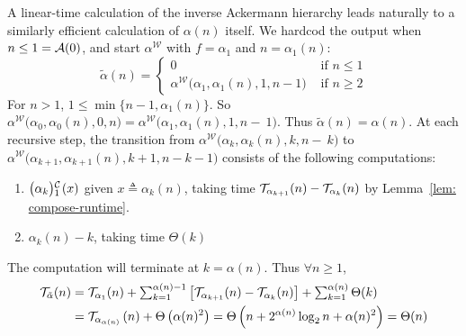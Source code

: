 A linear-time calculation of the inverse Ackermann hierarchy 
leads naturally to a similarly efficient calculation of $\alpha(n)$ itself.
We hardcod the output when $n\le 1 = \mathcal{A}(0)$, and start $\alpha^{\mathcal{W}}$ with $f = \alpha_1$ and $n = \alpha_1(n)$:
\begin{equation*}
\tilde{\alpha}(n) = \begin{cases}
0 & \text{ if } n \le 1 \\ \alpha^{\mathcal{W}}\big(\alpha_1, \alpha_1(n), 1, n-1\big) & \text{ if } n \ge 2
\end{cases}
\end{equation*}
For $n > 1$, $1\le \min\big\{n-1, \alpha_1(n)\big\}$. So
$\alpha^{\mathcal{W}}\big(\alpha_0, \alpha_0(n), 0, n\big) =
\alpha^{\mathcal{W}}\big(\alpha_1, \alpha_1(n), 1, n-~1\big)$.
Thus $\tilde{\alpha}(n) = \alpha(n)$. At each recursive step, the transition from $\alpha^{\mathcal{W}}\big(\alpha_k, \alpha_k(n), k, n-~k\big)$ to $\alpha^{\mathcal{W}}\big(\alpha_{k+1}, \alpha_{k+1}(n), k+1, n-k-1\big)$ consists of the following computations:
 \begin{enumerate} %
	\item $\cdt{\big(\alpha_k\big)}{1}(x)$ given $x\triangleq \alpha_k(n)$, taking time $\mathcal{T}_{\alpha_{k+1}}(n) - \mathcal{T}_{\alpha_k}(n)$ by Lemma~\ref{lem: compose-runtime}.
	\item $\alpha_k(n) - k$, taking time $\Theta(k)$
\end{enumerate}
The computation will terminate at $k = \alpha(n)$. Thus $\forall n\ge 1$,
\begin{equation} \label{eq: inv-ack-runtime-improved}
\begin{aligned}
\mathcal{T}_{\tilde{\alpha}}(n)
& = \textstyle \mathcal{T}_{\alpha_1}(n) + \sum_{k=1}^{\alpha(n) - 1}
\left[ \mathcal{T}_{\alpha_{k+1}}(n) - \mathcal{T}_{\alpha_k}(n)
\right] + \sum_{k=1}^{\alpha(n)}\Theta(k) \\
& = \mathcal{T}_{\alpha_{\alpha(n)}}\left(n\right) + \Theta\left(\alpha(n)^2\right)
= \Theta\left(n + 2^{\alpha(n)}\log_2n + \alpha(n)^2\right) = \Theta(n)
\end{aligned}
\end{equation}